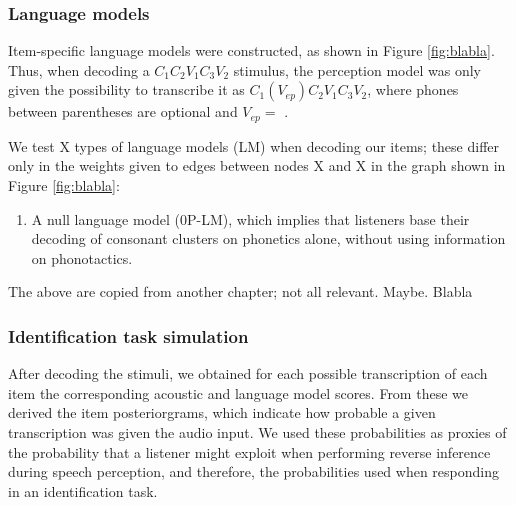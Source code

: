 \subsubsection{Language models}
Item-specific language models were constructed, as shown in Figure \ref{fig:blabla}. Thus, when decoding a $C_{1}C_{2}V_{1}C_{3}V_{2}$ stimulus, the perception model was only given the possibility to transcribe it as $C_{1}(V_{ep})C_{2}V_{1}C_{3}V_{2}$, where phones between parentheses are optional and $V_{ep} = $ \textipa{[@]}. 

We test {\color{red}X} types of language models (LM) when decoding our items; these differ only in the weights given to edges between nodes {\color{red}X and X} in the graph shown in Figure \ref{fig:blabla}: 
\begin{enumerate}
    \item A null language model (\textsc{0P-LM}), which implies that listeners base their decoding of consonant clusters on phonetics alone, without using information on phonotactics.
\end{enumerate}
{\color{red}The above are copied from another chapter; not all relevant. Maybe. Blabla}


\subsubsection{Identification task simulation}
After decoding the stimuli, we obtained for each possible transcription of each item the corresponding acoustic and language model scores. From these we derived the item posteriorgrams, which indicate how probable a given transcription was given the audio input. We used these probabilities as proxies of the probability that a listener might exploit when performing reverse inference during speech perception, and therefore, the probabilities used when responding in an identification task. 

